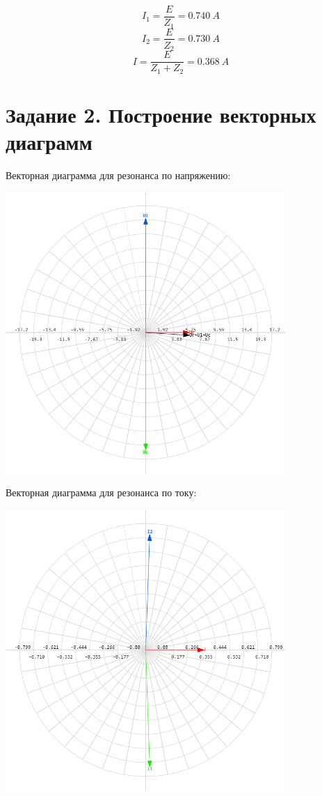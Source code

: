 \documentclass[14pt, a4paper]{article}
\begin{document}
        $$I_1 = \frac{E}{Z_1} = 0.740 \ A$$
        $$I_2 = \frac{E}{Z_2} = 0.730 \ A$$
        $$I = \frac{E}{Z_1 + Z_2} = 0.368 \ A$$

    \section*{Задание 2. Построение векторных диаграмм}
        Векторная диаграмма для резонанса по напряжению:

        {\includegraphics[width=0.8\textwidth]{vecPH.png}}

        Векторная диаграмма для резонанса по току:

        {\includegraphics[width=0.8\textwidth]{vecPT.png}}
\end{document}
